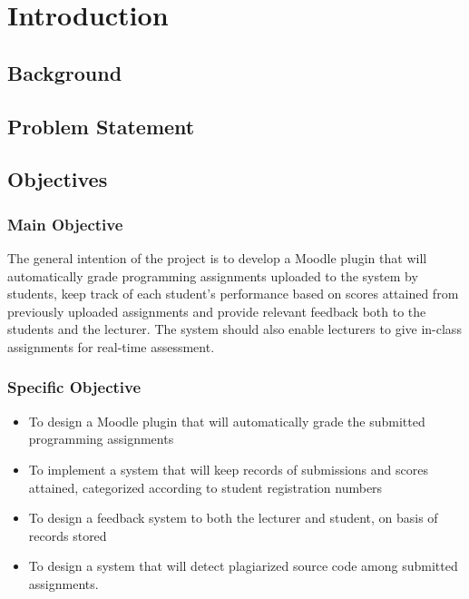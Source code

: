 \documentclass[12pt]{article}
\begin{document}
\section{Introduction}
	\subsection{Background}
	\subsection{Problem Statement}
	\subsection{Objectives}
		\subsubsection{Main Objective}
		The general intention of the project is to develop a Moodle plugin that will automatically grade programming assignments 		uploaded to the system by students, keep track of each student’s performance based on scores attained from previously 			uploaded assignments and provide relevant feedback both to the students and the lecturer. The system should also enable 			lecturers to give in-class assignments for real-time assessment.
		\subsubsection{Specific Objective}
		\begin{itemize}
			\item To design a Moodle plugin that will automatically grade the submitted programming assignments 
			\item To implement a system that will keep records of submissions and scores attained, categorized according to 						student registration numbers
			\item To design a feedback system to both the lecturer and student, on basis of records stored
			\item To design a system that will detect plagiarized source code among submitted assignments.
		\end{itemize}
		
\end{document}
